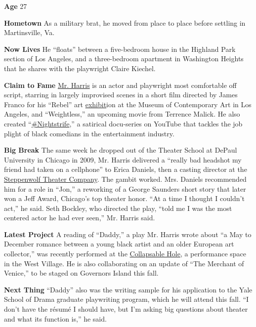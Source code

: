 \textbf{Age} 27

\textbf{Hometown} As a military brat, he moved from place to place
before settling in Martinsville, Va.

\textbf{Now Lives} He ``floats'' between a five-bedroom house in the
Highland Park section of Los Angeles, and a three-bedroom apartment in
Washington Heights that he shares with the playwright Claire Kiechel.

\textbf{Claim to Fame} \href{http://www.jeremyoharris.com/}{Mr. Harris}
is an actor and playwright most comfortable off script, starring in
largely improvised scenes in a short film directed by James Franco for
his ``Rebel'' art
\href{http://articles.latimes.com/2012/may/14/entertainment/la-et-franco-rebel-20120512}{exhibit}ion
at the Museum of Contemporary Art in Los Angeles, and ``Weightless,'' an
upcoming movie from Terrence Malick. He also created
``\href{https://www.youtube.com/channel/UCIY-kLF1ngqHzUCeryOrFWg}{\#Nightstrife},''
a satirical docu-series on YouTube that tackles the job plight of black
comedians in the entertainment industry.

\textbf{Big Break} The same week he dropped out of the Theater School at
DePaul University in Chicago in 2009, Mr. Harris delivered a ``really
bad headshot my friend had taken on a cellphone'' to Erica Daniels, then
a casting director at the
\href{https://www.steppenwolf.org/}{Steppenwolf Theater Company}. The
gambit worked. Mrs. Daniels recommended him for a role in ``Jon,'' a
reworking of a George Saunders short story that later won a Jeff Award,
Chicago's top theater honor. ``At a time I thought I couldn't act,'' he
said. Seth Bockley, who directed the play, ``told me I was the most
centered actor he had ever seen,'' Mr. Harris said.

\textbf{Latest Project} A reading of ``Daddy,'' a play Mr. Harris wrote
about ``a May to December romance between a young black artist and an
older European art collector,'' was recently performed at the
\href{http://www.radiohole.com/hole.html}{Collapsable Hole}, a
performance space in the West Village. He is also collaborating on an
update of ``The Merchant of Venice,'' to be staged on Governors Island
this fall.

\textbf{Next Thing} ``Daddy'' also was the writing sample for his
application to the Yale School of Drama graduate playwriting program,
which he will attend this fall. ``I don't have the résumé I should have,
but I'm asking big questions about theater and what its function is,''
he said.


